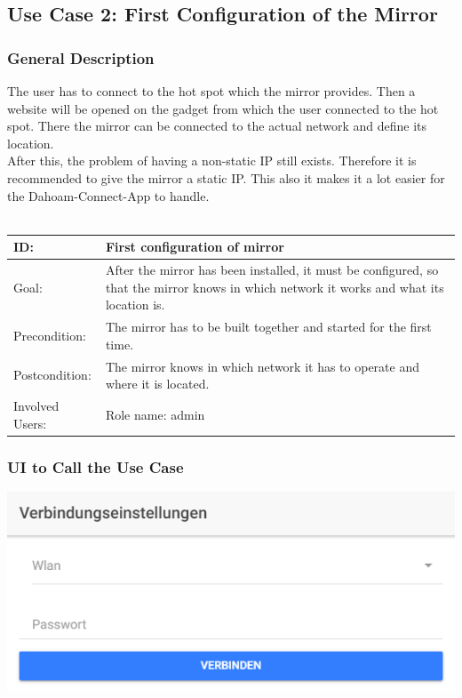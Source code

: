 \documentclass[12pt]{article}
\theoremstyle{definition}
\begin{document}
\subsection{Use Case 2: First Configuration of the Mirror}
\subsubsection{General Description}
The user has to connect to the hot spot which the mirror provides. Then a website will be opened on the gadget from which the user connected to the hot spot. There the mirror can be connected to the actual network and define its location.\\
After this, the problem of having a non-static IP still exists. Therefore it is recommended to give the mirror a static IP. This also it makes it a lot easier for the Dahoam-Connect-App to handle.\\\\
\begin{tabular}{|p{.2\linewidth}|p{.65\linewidth}|}
\hline 
ID: & First configuration of mirror \\ \hline
Goal: & After the mirror has been installed, it must be configured, so that the mirror knows in which network it works and what its location is.\\ \hline
Precondition: & The mirror has to be built together and started for the first time.\\ \hline
Postcondition: & The mirror knows in which network it has to operate and where it is located.\\ \hline
Involved Users: & Role name: admin \\ \hline
\end{tabular}

\subsubsection{UI to Call the Use Case}
\begin{center}
\includegraphics[scale=.8]{UseCase/StandartWlanEinstellungen.PNG}\\
\end{center}
\end{document}
